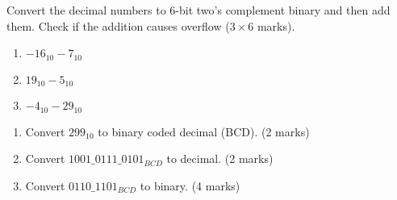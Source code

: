 \begin{prob}
  Convert the decimal numbers to 6-bit two's complement binary and then add
  them. Check if the addition causes overflow ($3 \times 6$ marks).
  \begin{enumerate}
  \item $-16_{10} - 7_{10}$
  \item $19_{10} - 5_{10}$
  \item $-4_{10} - 29_{10}$
  \end{enumerate}
\end{prob}

\vspace{20em}

\begin{prob}
  \begin{enumerate}
  \item Convert $299_{10}$  to binary coded decimal (BCD). (2 marks)
  \item Convert $1001\_ 0111\_ 0101_{BCD}$  to decimal. (2 marks)
  \item Convert $0110\_ 1101_{BCD}$  to binary. (4 marks)
  \end{enumerate}
\end{prob}

\vspace{20em}

